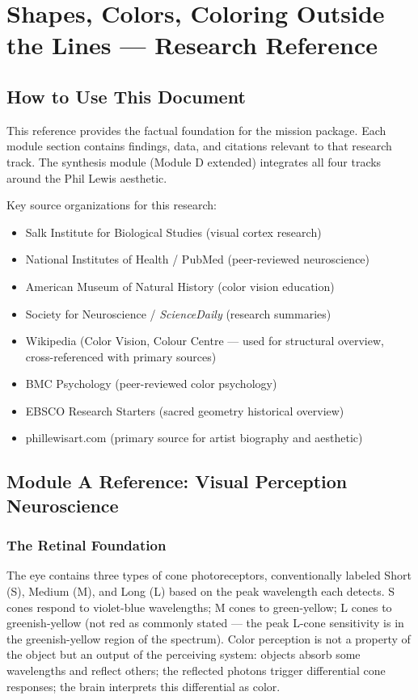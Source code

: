 \documentclass[11pt,letterpaper]{article}
\begin{document}
\section{Shapes, Colors, Coloring Outside the Lines --- Research Reference}

\subsection{How to Use This Document}

This reference provides the factual foundation for the mission package. Each module section contains findings, data, and citations relevant to that research track. The synthesis module (Module D extended) integrates all four tracks around the Phil Lewis aesthetic.

Key source organizations for this research:
\begin{itemize}[noitemsep]
  \item Salk Institute for Biological Studies (visual cortex research)
  \item National Institutes of Health / PubMed (peer-reviewed neuroscience)
  \item American Museum of Natural History (color vision education)
  \item Society for Neuroscience / \textit{ScienceDaily} (research summaries)
  \item Wikipedia (Color Vision, Colour Centre --- used for structural overview, cross-referenced with primary sources)
  \item BMC Psychology (peer-reviewed color psychology)
  \item EBSCO Research Starters (sacred geometry historical overview)
  \item phillewisart.com (primary source for artist biography and aesthetic)
\end{itemize}

\subsection{Module A Reference: Visual Perception Neuroscience}

\subsubsection{The Retinal Foundation}

The eye contains three types of cone photoreceptors, conventionally labeled Short (S), Medium (M), and Long (L) based on the peak wavelength each detects. S cones respond to violet-blue wavelengths; M cones to green-yellow; L cones to greenish-yellow (not red as commonly stated --- the peak L-cone sensitivity is in the greenish-yellow region of the spectrum). Color perception is not a property of the object but an output of the perceiving system: objects absorb some wavelengths and reflect others; the reflected photons trigger differential cone responses; the brain interprets this differential as color.
\end{document}
